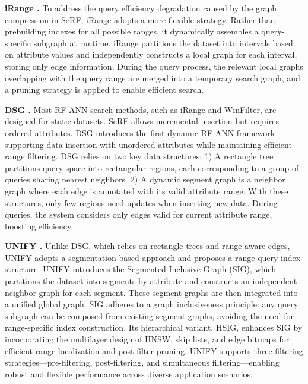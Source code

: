 \documentclass[sigconf, nonacm]{acmart}
\begin{document}
\begin{sloppypar}
\vspace{1em}
\noindent\textbf{\underline{iRange \cite{iRangeGraph}.}}  
To address the query efficiency degradation caused by the graph compression in SeRF, iRange adopts a more flexible strategy. Rather than prebuilding indexes for all possible ranges, it dynamically assembles a query-specific subgraph at runtime. iRange partitions the dataset into intervals based on attribute values and independently constructs a local graph for each interval, storing only edge information. During the query process, the relevant local graphs overlapping with the query range are merged into a temporary search graph, and a pruning strategy is applied to enable efficient search.

\vspace{1em}
\noindent\textbf{\underline{DSG \cite{DSG}.}}  
Most RF-ANN search methods, such as iRange and WinFilter, are designed for static datasets. SeRF allows incremental insertion but requires ordered attributes. DSG introduces the first dynamic RF-ANN framework supporting data insertion with unordered attributes while maintaining efficient range filtering.
DSG relies on two key data structures: 1) A rectangle tree partitions query space into rectangular regions, each corresponding to a group of queries sharing nearest neighbors. 2) A dynamic segment graph is a neighbor graph where each edge is annotated with its valid attribute range.
With these structures, only few regions need updates when inserting new data. During queries, the system considers only edges valid for current attribute range, boosting efficiency.



\vspace{1em}
\noindent\textbf{\underline{UNIFY \cite{UNIFY}.}}  
Unlike DSG, which relies on rectangle trees and range-aware edges, UNIFY adopts a segmentation-based approach and proposes a range query index structure. UNIFY introduces the Segmented Inclusive Graph (SIG), which partitions the dataset into segments by attribute and constructs an independent neighbor graph for each segment. These segment graphs are then integrated into a unified global graph. SIG adheres to a graph inclusiveness principle: any query subgraph can be composed from existing segment graphs, avoiding the need for range-specific index construction. Its hierarchical variant, HSIG, enhances SIG by incorporating the multilayer design of HNSW, skip lists, and edge bitmaps for efficient range localization and post-filter pruning. UNIFY supports three filtering strategies—pre-filtering, post-filtering, and  simultaneous filtering—enabling robust and flexible performance across diverse application scenarios.




\end{sloppypar}
\end{document}
